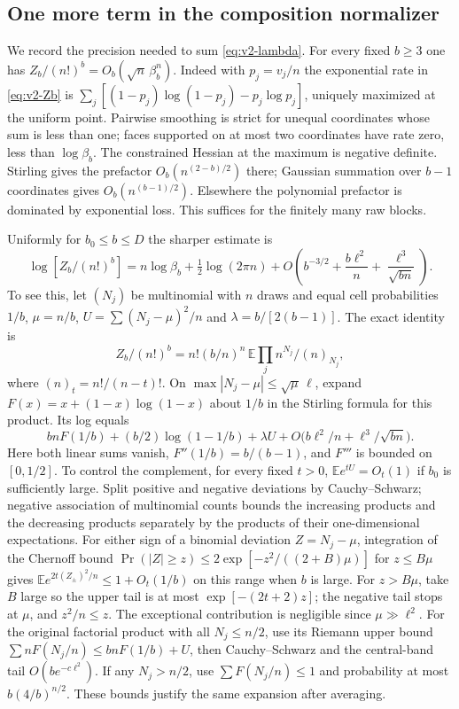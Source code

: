 \subsection{One more term in the composition normalizer}

We record the precision needed to sum \eqref{eq:v2-lambda}. For every
fixed $b\ge3$ one has $Z_b/(n!)^b=O_b(\sqrt n\,\beta_b^n)$.
Indeed with $p_j=v_j/n$ the exponential rate in \eqref{eq:v2-Zb}
is $\sum_j[(1-p_j)\log(1-p_j)-p_j\log p_j]$, uniquely maximized
at the uniform point. Pairwise smoothing is strict for unequal
coordinates whose sum is less than one; faces supported on at most two
coordinates have rate zero, less than $\log\beta_b$. The constrained
Hessian at the maximum is negative definite. Stirling gives the prefactor
$O_b(n^{(2-b)/2})$ there; Gaussian summation over $b-1$ coordinates gives
$O_b(n^{(b-1)/2})$. Elsewhere the polynomial prefactor is dominated by
exponential loss. This suffices for the finitely many raw blocks.

Uniformly for $b_0\le b\le D$ the sharper estimate is
\begin{equation}\label{eq:v2-sharp-Z}
 \log[Z_b/(n!)^b]= n\log\beta_b+\tfrac12\log(2\pi n)
 +O\left(b^{-3/2}+\frac{b\ell^2}{n}+
                 \frac{\ell^3}{\sqrt{bn}}\right).
\end{equation}
To see this, let $(N_j)$ be multinomial with $n$ draws and equal cell
probabilities $1/b$, $\mu=n/b$, $U=\sum(N_j-\mu)^2/n$ and
$\lambda=b/[2(b-1)]$. The exact identity is
\[
 Z_b/(n!)^b=n!(b/n)^n\,\mathbb E\prod_j n^{N_j}/(n)_{N_j},
\]
where $(n)_t=n!/(n-t)!$. On $\max|N_j-\mu|\le\sqrt\mu\,\ell$, expand
$F(x)=x+(1-x)\log(1-x)$ about $1/b$ in the Stirling formula for this
product. Its log equals
\[
 bnF(1/b)+(b/2)\log(1-1/b)+\lambda U
             +O\bigl(b\ell^2/n+\ell^3/\sqrt{bn}\bigr).
\]
Here both linear sums vanish, $F''(1/b)=b/(b-1)$, and $F'''$ is bounded
on $[0,1/2]$. To control the complement, for every fixed $t>0$,
$\mathbb E e^{tU}=O_t(1)$ if $b_0$ is sufficiently large. Split positive
and negative deviations by Cauchy--Schwarz; negative association of
multinomial counts bounds the increasing products and the decreasing
products separately by the products of their one-dimensional expectations.
For either sign of a binomial deviation $Z=N_j-\mu$, integration of the
Chernoff bound $\Pr(|Z|\ge z)\le 2\exp[-z^2/((2+B)\mu)]$ for
$z\le B\mu$ gives $\mathbb E e^{2t(Z_\pm)^2/n}\le1+O_t(1/b)$ on
this range when $b$ is large. For $z>B\mu$, take $B$ large so the
upper tail is at most $\exp[-(2t+2)z]$; the negative tail stops at
$\mu$, and $z^2/n\le z$. The exceptional contribution is negligible
since $\mu\gg\ell^2$. For the original factorial product with all
$N_j\le n/2$, use its Riemann upper bound $\sum nF(N_j/n)\le
bnF(1/b)+U$, then Cauchy--Schwarz and the central-band tail
$O(b e^{-c\ell^2})$. If any $N_j>n/2$, use $\sum F(N_j/n)\le1$
and probability at most $b(4/b)^{n/2}$. These bounds justify the same
expansion after averaging.

